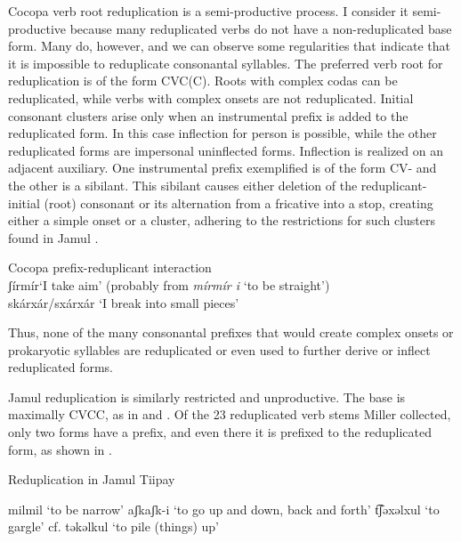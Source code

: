 \documentclass[output=paper,colorlinks,citecolor=brown]{langscibook}
\begin{document}
Cocopa verb root reduplication is a semi-productive process. I consider it semi-productive because many reduplicated verbs do not have a non-reduplicated base form. Many do, however, and we can observe some regularities that indicate that it is impossible to reduplicate consonantal syllables. The preferred verb root for reduplication is of the form CVC(C). Roots with complex codas can be reduplicated, while verbs with complex onsets are not reduplicated. Initial consonant clusters arise only when an instrumental prefix is added to the reduplicated form. In this case inflection for person is possible, while the other reduplicated forms are impersonal uninflected forms. Inflection is realized on an adjacent auxiliary. One instrumental prefix exemplified is of the form CV- and the other is a sibilant. This sibilant causes either deletion of the reduplicant-initial (root) consonant or its alternation from a fricative into a stop, creating either a simple onset or a cluster, adhering to the restrictions for such clusters found in Jamul . 

\begin{exe}
    \ex \label{ex9}Cocopa prefix-reduplicant interaction\\
    ʃírmír\tab  ‘I take aim’ (probably from \textit{mírmír i} ‘to be straight’)\\
    skárxár/sxárxár \tab ‘I break into small pieces’
\end{exe}

Thus, none of the many consonantal prefixes that would create complex onsets or prokaryotic syllables are reduplicated or even used to further derive or inflect reduplicated forms.

Jamul reduplication is similarly restricted and unproductive. The base is maximally CVCC, as in  and .  Of the 23 reduplicated verb stems Miller collected, only two forms have a prefix, and even there it is prefixed to the reduplicated form, as shown in . 

\begin{exe}
    \ex \label{ex10}
    Reduplication in Jamul Tiipay
    \begin{xlist}
        \ex \label{ex10a}milmil \tab    ‘to be narrow’
        \ex \label{ex10b}aʃkaʃk-i  \tab   ‘to go up and down, back and forth’
        \ex \label{ex10c}t͡ʃəxəlxul \tab   ‘to gargle’ cf.        təkəlkul      ‘to pile (things) up’
    \end{xlist}
\end{exe}
\end{document}
